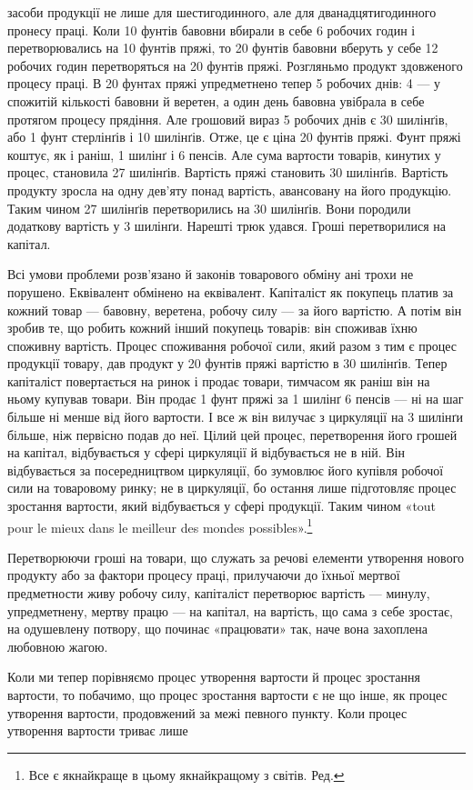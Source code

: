\parcont{}  %
засоби продукції не лише для шестигодинного, але для дванадцятигодинного
пронесу праці. Коли 10 фунтів бавовни вбирали
в себе 6 робочих годин і перетворювались на 10 фунтів пряжі, то
20 фунтів бавовни вберуть у себе 12 робочих годин  перетворяться
на 20 фунтів пряжі. Розгляньмо продукт здовженого процесу
праці. В 20 фунтах пряжі упредметнено тепер 5 робочих днів:
4 — у спожитій кількості бавовни й веретен, а один день бавовна
увібрала в себе протягом процесу прядіння. Але грошовий вираз
5 робочих днів є 30 шилінґів, або 1 фунт стерлінґів і 10 шилінґів.
Отже, це є ціна 20 фунтів пряжі. Фунт пряжі коштує, як і
раніш, 1 шилінґ і 6 пенсів. Але сума вартости товарів, кинутих у
процес, становила 27 шилінґів. Вартість пряжі становить 30 шилінґів.
Вартість продукту зросла на одну дев’яту понад вартість,
авансовану на його продукцію. Таким чином 27 шилінґів перетворились
на 30 шилінґів. Вони породили додаткову вартість
у 3 шилінґи. Нарешті трюк удався. Гроші перетворилися
на капітал.

Всі умови проблеми розв’язано й законів товарового обміну
ані трохи не порушено. Еквівалент обмінено на еквівалент.
Капіталіст як покупець платив за кожний товар — бавовну,
веретена, робочу силу — за його вартістю. А потім він зробив
те, що робить кожний інший покупець товарів: він споживав
їхню споживну вартість. Процес споживання робочої сили, який
разом з тим є процес продукції товару, дав продукт у 20 фунтів
пряжі вартістю в 30 шилінґів. Тепер капіталіст повертається
на ринок і продає товари, тимчасом як раніш він на ньому
купував товари. Він продає 1 фунт пряжі за 1 шилінґ 6 пенсів —
ні на шаг більше ні менше від його вартости. І все ж він вилучає
з циркуляції на 3 шилінґи більше, ніж первісно подав до неї.
Цілий цей процес, перетворення його грошей на капітал, відбувається
у сфері циркуляції й відбувається не в ній. Він відбувається
за посередництвом циркуляції, бо зумовлює його купівля
робочої сили на товаровому ринку; не в циркуляції, бо остання
лише підготовляє процес зростання вартости, який відбувається
у сфері продукції. Таким чином «tout pour le mieux dans le meilleur
des mondes possibles».\footnote*{
Все є якнайкраще в цьому якнайкращому з світів. Ред.
}

Перетворюючи гроші на товари, що служать за речові
елементи утворення нового продукту або за фактори процесу
праці, прилучаючи до їхньої мертвої предметности живу робочу
силу, капіталіст перетворює вартість — минулу, упредметнену,
мертву працю — на капітал, на вартість, що сама з себе зростає,
на одушевлену потвору, що починає «працювати» так, наче вона
захоплена любовною жагою.

Коли ми тепер порівняємо процес утворення вартости й процес
зростання вартости, то побачимо, що процес зростання вартости є
не що інше, як процес утворення вартости, продовжений за межі
певного пункту. Коли процес утворення вартости триває лише
\parbreak{}  %
